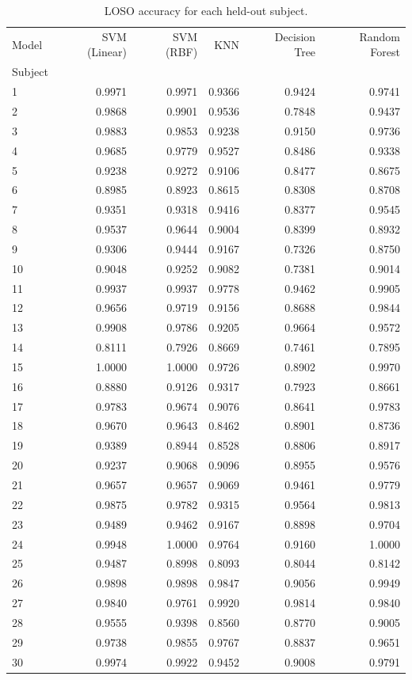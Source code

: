 \begin{table}
\caption{LOSO accuracy for each held-out subject.}
\label{tab:Ext09_loso_per_subject_accuracy}
\begin{tabular}{lrrrrr}
\toprule
Model & SVM (Linear) & SVM (RBF) & KNN & Decision Tree & Random Forest \\
Subject &  &  &  &  &  \\
\midrule
1 & 0.9971 & 0.9971 & 0.9366 & 0.9424 & 0.9741 \\
2 & 0.9868 & 0.9901 & 0.9536 & 0.7848 & 0.9437 \\
3 & 0.9883 & 0.9853 & 0.9238 & 0.9150 & 0.9736 \\
4 & 0.9685 & 0.9779 & 0.9527 & 0.8486 & 0.9338 \\
5 & 0.9238 & 0.9272 & 0.9106 & 0.8477 & 0.8675 \\
6 & 0.8985 & 0.8923 & 0.8615 & 0.8308 & 0.8708 \\
7 & 0.9351 & 0.9318 & 0.9416 & 0.8377 & 0.9545 \\
8 & 0.9537 & 0.9644 & 0.9004 & 0.8399 & 0.8932 \\
9 & 0.9306 & 0.9444 & 0.9167 & 0.7326 & 0.8750 \\
10 & 0.9048 & 0.9252 & 0.9082 & 0.7381 & 0.9014 \\
11 & 0.9937 & 0.9937 & 0.9778 & 0.9462 & 0.9905 \\
12 & 0.9656 & 0.9719 & 0.9156 & 0.8688 & 0.9844 \\
13 & 0.9908 & 0.9786 & 0.9205 & 0.9664 & 0.9572 \\
14 & 0.8111 & 0.7926 & 0.8669 & 0.7461 & 0.7895 \\
15 & 1.0000 & 1.0000 & 0.9726 & 0.8902 & 0.9970 \\
16 & 0.8880 & 0.9126 & 0.9317 & 0.7923 & 0.8661 \\
17 & 0.9783 & 0.9674 & 0.9076 & 0.8641 & 0.9783 \\
18 & 0.9670 & 0.9643 & 0.8462 & 0.8901 & 0.8736 \\
19 & 0.9389 & 0.8944 & 0.8528 & 0.8806 & 0.8917 \\
20 & 0.9237 & 0.9068 & 0.9096 & 0.8955 & 0.9576 \\
21 & 0.9657 & 0.9657 & 0.9069 & 0.9461 & 0.9779 \\
22 & 0.9875 & 0.9782 & 0.9315 & 0.9564 & 0.9813 \\
23 & 0.9489 & 0.9462 & 0.9167 & 0.8898 & 0.9704 \\
24 & 0.9948 & 1.0000 & 0.9764 & 0.9160 & 1.0000 \\
25 & 0.9487 & 0.8998 & 0.8093 & 0.8044 & 0.8142 \\
26 & 0.9898 & 0.9898 & 0.9847 & 0.9056 & 0.9949 \\
27 & 0.9840 & 0.9761 & 0.9920 & 0.9814 & 0.9840 \\
28 & 0.9555 & 0.9398 & 0.8560 & 0.8770 & 0.9005 \\
29 & 0.9738 & 0.9855 & 0.9767 & 0.8837 & 0.9651 \\
30 & 0.9974 & 0.9922 & 0.9452 & 0.9008 & 0.9791 \\
\bottomrule
\end{tabular}
\end{table}
